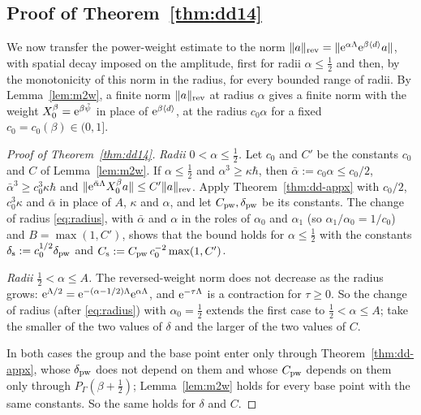 \subsection{Proof of Theorem~\texorpdfstring{\ref{thm:dd14}}{1.2}}\label{sec:swapped}
We now transfer the power-weight estimate to the norm $\lVert a\rVert_{\mathrm{rev}}=\lVert \mathrm{e}^{\alpha\Lambda}\mathrm{e}^{\beta\langle d\rangle}a\rVert$, with spatial
decay imposed on the amplitude, first for radii $\alpha\le\tfrac12$ and then, by the monotonicity of this norm in the radius, for
every bounded range of radii. By Lemma~\ref{lem:m2w}, a finite norm $\lVert a\rVert_{\mathrm{rev}}$ at radius $\alpha$ gives a finite norm with the
weight $X_0^\beta=\mathrm{e}^{\beta\tilde\psi}$ in place of $\mathrm{e}^{\beta\langle d\rangle}$, at the radius $c_0\alpha$ for a fixed
$c_0=c_0(\beta)\in(0,1]$.

\begin{proof}[Proof of Theorem~\ref{thm:dd14}]
\emph{Radii $0<\alpha\le\tfrac12$.} Let $c_0$ and $C'$ be the constants $c_0$ and $C$ of Lemma~\ref{lem:m2w}. If $\alpha\le\tfrac12$ and
$\alpha^3\ge\kappa\hbar$, then $\bar\alpha:=c_0\alpha\le c_0/2$, $\bar\alpha^3\ge c_0^3\kappa\hbar$ and
$\lVert \mathrm{e}^{\bar\alpha\Lambda}X_0^\beta a\rVert\le C'\lVert a\rVert_{\mathrm{rev}}$. Apply Theorem~\ref{thm:dd-appx} with $c_0/2$, $c_0^3\kappa$ and $\bar\alpha$
in place of $A$, $\kappa$ and $\alpha$, and let $C_{\rm pw},\delta_{\rm pw}$ be its constants. The change of radius \eqref{eq:radius}, with
$\bar\alpha$ and $\alpha$ in the roles of $\alpha_0$ and $\alpha_1$ (so $\alpha_1/\alpha_0=1/c_0$) and $B=\max(1,C')$, shows that the bound holds for
$\alpha\le\tfrac12$ with the constants $\delta_{\rm s}:=c_0^{1/2}\delta_{\rm pw}$ and $C_{\rm s}:=C_{\rm pw}\,c_0^{-2}\max(1,C')$.

\emph{Radii $\tfrac12<\alpha\le A$.} The reversed-weight norm does not decrease as the radius grows:
$\mathrm{e}^{\Lambda/2}=\mathrm{e}^{-(\alpha-1/2)\Lambda}\mathrm{e}^{\alpha\Lambda}$, and $\mathrm{e}^{-\tau\Lambda}$ is a contraction for $\tau\ge0$. So the change of radius
(after \eqref{eq:radius}) with $\alpha_0=\tfrac12$ extends the first case to $\tfrac12<\alpha\le A$; take the smaller of the two values of $\delta$
and the larger of the two values of $C$.

In both cases the group and the base point enter only through Theorem~\ref{thm:dd-appx}, whose $\delta_{\rm pw}$ does not depend
on them and whose $C_{\rm pw}$ depends on them only through $P_\Gamma(\beta+\tfrac12)$; Lemma~\ref{lem:m2w} holds for every base
point with the same constants. So the same holds for $\delta$ and $C$.
\end{proof}
